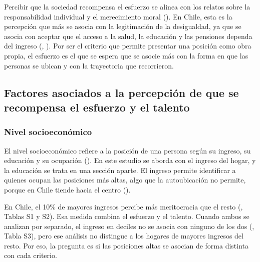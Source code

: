 \documentclass[
  spanish,
  a4paper,
  oneside]{scrbook}
\begin{document}
Percibir que la sociedad recompensa el esfuerzo se alinea con los
relatos sobre la responsabilidad individual y el merecimiento moral
(). En
Chile, esta es la percepción que más se asocia con la legitimación de la
desigualdad, ya que se asocia con aceptar que el acceso a la salud, la
educación y las pensiones dependa del ingreso
(,
).
Por ser el criterio que permite presentar una posición como obra propia,
el esfuerzo es el que se espera que se asocie más con la forma en que
las personas se ubican y con la trayectoria que recorrieron.

\subsection{Factores asociados a la percepción de que se recompensa el
esfuerzo y el
talento}\label{factores-asociados-a-la-percepciuxf3n-de-que-se-recompensa-el-esfuerzo-y-el-talento}

\subsubsection{Nivel socioeconómico}\label{nivel-socioeconuxf3mico-1}

El nivel socioeconómico refiere a la posición de una persona según su
ingreso, su educación y su ocupación
(). En este
estudio se aborda con el ingreso del hogar, y la educación se trata en
una sección aparte. El ingreso permite identificar a quienes ocupan las
posiciones más altas, algo que la autoubicación no permite, porque en
Chile tiende hacia el centro
().

En Chile, el 10\% de mayores ingresos percibe más meritocracia que el
resto (, Tablas S1 y S2). Esa medida combina el esfuerzo y el
talento. Cuando ambos se analizan por separado, el ingreso en deciles no
se asocia con ninguno de los dos
(, Tabla S3), pero ese análisis no distingue a los hogares de
mayores ingresos del resto. Por eso, la pregunta es si las posiciones
altas se asocian de forma distinta con cada criterio.
\end{document}
